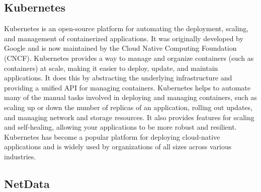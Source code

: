 \subsection{Kubernetes}
\label{sec:kubernetes-third-party}
  Kubernetes \cite{the-linux-foundationKubernetesDocumentationGetting} is an open-source platform for automating the deployment, scaling, and management of containerized applications. It was originally developed by Google and is now maintained by the Cloud Native Computing Foundation (CNCF).
  Kubernetes provides a way to manage and organize containers (such as  containers) at scale, making it easier to deploy, update, and maintain applications. It does this by abstracting the underlying infrastructure and providing a unified API for managing containers.
  Kubernetes helps to automate many of the manual tasks involved in deploying and managing containers, such as scaling up or down the number of replicas of an application, rolling out updates, and managing network and storage resources. It also provides features for scaling and self-healing, allowing your applications to be more robust and resilient.
  Kubernetes has become a popular platform for deploying cloud-native applications and is widely used by organizations of all sizes across various industries.

  \subsection{NetData}
  \label{sec:netdata-third-party}

